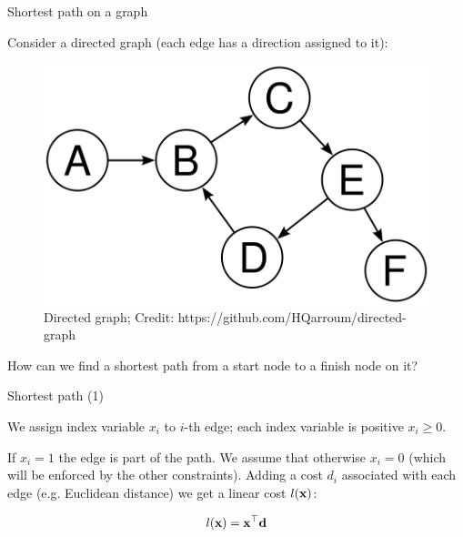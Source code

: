 \documentclass{beamer}
\begin{document}
\begin{frame}{Shortest path on a graph}
\begin{flushleft}

Consider a directed graph (each edge has a direction assigned to it):

\begin{figure}
	\centering
	\includegraphics[width=0.5\linewidth]{DirectedGraph}
	\caption[]{Directed graph; \scriptsize{Credit: https://github.com/HQarroum/directed-graph}}
	\label{fig:directedgraph}
\end{figure}

How can we find a shortest path from a start node to a finish node on it?

\end{flushleft}
\end{frame}

\begin{frame}
	\begin{flushleft}
		
		
	\end{flushleft}
\end{frame}

\begin{frame}{Shortest path (1)}
\begin{flushleft}

We assign index variable $x_i$ to $i$-th edge; each index variable is positive $x_i \geq 0$. 

\bigskip

If $x_i = 1$ the edge is part of the path. We assume that otherwise $x_i = 0$ (which will be enforced by the other constraints). Adding a cost $d_i$ associated with each edge (e.g. Euclidean distance) we get a linear cost $l(\mathbf{x})$:

\begin{equation}
	l(\mathbf{x}) = \mathbf{x}^\top \mathbf{d}
\end{equation}

 
\end{flushleft}
\end{frame}
\end{document}
